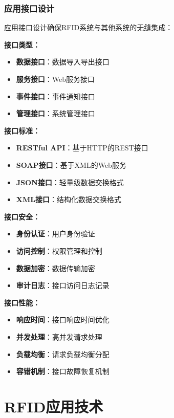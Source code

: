 \documentclass[12pt,UTF8]{ctexbook}
\begin{document}
\begin{itemize}[leftmargin=3.5em]
\begin{itemize}[leftmargin=3.5em]
\section{应用接口设计}

应用接口设计确保RFID系统与其他系统的无缝集成：

\textbf{接口类型：}
\begin{itemize}[leftmargin=3.5em]
    \item \textbf{数据接口}：数据导入导出接口
    \item \textbf{服务接口}：Web服务接口
    \item \textbf{事件接口}：事件通知接口
    \item \textbf{管理接口}：系统管理接口
\end{itemize}

\textbf{接口标准：}
\begin{itemize}[leftmargin=3.5em]
    \item \textbf{RESTful API}：基于HTTP的REST接口
    \item \textbf{SOAP接口}：基于XML的Web服务
    \item \textbf{JSON接口}：轻量级数据交换格式
    \item \textbf{XML接口}：结构化数据交换格式
\end{itemize}

\textbf{接口安全：}
\begin{itemize}[leftmargin=3.5em]
    \item \textbf{身份认证}：用户身份验证
    \item \textbf{访问控制}：权限管理和控制
    \item \textbf{数据加密}：数据传输加密
    \item \textbf{审计日志}：接口访问日志记录
\end{itemize}

\textbf{接口性能：}
\begin{itemize}[leftmargin=3.5em]
    \item \textbf{响应时间}：接口响应时间优化
    \item \textbf{并发处理}：高并发请求处理
    \item \textbf{负载均衡}：请求负载均衡分配
    \item \textbf{容错机制}：接口故障恢复机制
\end{itemize}

\part{RFID应用技术}


\end{itemize}
\end{itemize}
\end{document}
